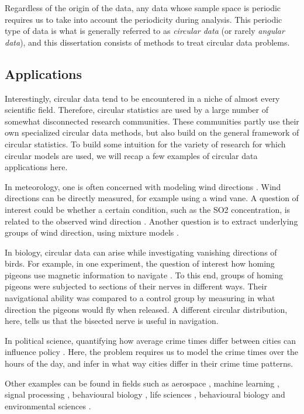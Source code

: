 \documentclass[12pt, a4paper]{book}\usepackage[]{graphicx}\usepackage{xcolor}
\begin{document}
Regardless of the origin of the data, any data whose sample space is periodic requires us to  take into account the periodicity during analysis. This periodic type of data is what is generally referred to as \textit{circular data} (or rarely \textit{angular data}), and this dissertation consists of methods to treat circular data problems.

\subsection*{Applications}

Interestingly, circular data tend to be encountered in a niche of almost every scientific field. Therefore, circular statistics are used by a large number of somewhat disconnected research communities. These communities partly use their own specialized circular data methods, but also build on the general framework of circular statistics. To build some intuition for the variety of research for which circular models are used, we will recap a few examples of circular data applications here.

In meteorology, one is often concerned with modeling wind directions \citep{bowers2000directional}. Wind directions can be directly measured, for example using a wind vane. A question of interest could be whether a certain condition, such as the SO2 concentration, is related to the observed wind direction \citep{garcia2013exploring}. Another question is to extract underlying groups of wind direction, using mixture models \citep{masseran2013fitting}.

In biology, circular data can arise while investigating vanishing directions of birds. For example, in one experiment, the question of interest how homing pigeons use magnetic information to navigate \citep{gagliardo2008navigational}. To this end, groups of homing pigeons were subjected to sections of their nerves in different ways. Their navigational ability was compared to a control group by measuring in what direction the pigeons would fly when released. A different circular distribution, here, tells us that the bisected nerve is useful in navigation.

In political science, quantifying how average crime times differ between cities can influence policy \citep{gill2010}. Here, the problem requires us to model the crime times over the hours of the day, and infer in what way cities differ in their crime time patterns.

Other examples can be found in fields such as aerospace \citep{kurz2017deterministic},  machine learning \citep{gopal2014mises}, signal processing \citep{traa2013wrapped}, behavioural biology \citep{nunez2018bayesian}, life sciences \citep{mardianew}, behavioural biology \citep{bulbert2015danger} and environmental sciences \citep{lagona2016regression, lagona2015hidden, arnold2006recent}.
\end{document}

